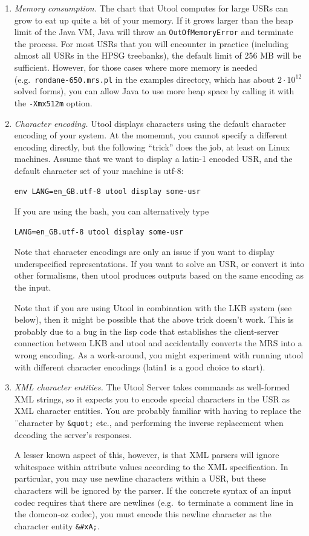 \begin{enumerate}
\item \textit{Memory consumption.} The chart that Utool computes for
large USRs can grow to eat up quite a bit of your memory. If it grows
larger than the heap limit of the Java VM, Java will throw an
\verb?OutOfMemoryError? and terminate the process. For most USRs that
you will encounter in practice (including almost all USRs in the HPSG
treebanks), the default limit of 256 MB will be sufficient. However,
for those cases where more memory is needed (e.g.\
\verb?rondane-650.mrs.pl? in the examples directory, which has about
$2 \cdot 10^{12}$ solved forms), you can allow Java to use more heap
space by calling it with the \verb?-Xmx512m? option.

\item \textit{Character encoding.} Utool displays characters using the default
character encoding of your system. At the momemnt, you cannot specify a different encoding directly, but the following ``trick'' does the job, at least on Linux machines. Assume that we want to display a latin-1 encoded USR, and the default character set of your machine is utf-8:
\begin{verbatim}
env LANG=en_GB.utf-8 utool display some-usr
\end{verbatim}
If you are using the bash, you can alternatively type
\begin{verbatim}
LANG=en_GB.utf-8 utool display some-usr
\end{verbatim}

Note that character encodings are only an issue if you want to display
underspecified representations. If you want to solve an USR, or convert it
into other formalisms, then utool produces outputs based on the same encoding as
the input.

Note that if you are using Utool in combination with the LKB system (see below),
then it might be possible that the above trick doesn't work. This is probably
due to a bug in the lisp code that establishes the client-server connection
between LKB and utool and accidentally converts the MRS into a wrong encoding.
As a work-around, you might experiment with running utool with different
character encodings (latin1 is a good choice to start).

\item \textit{XML character entities.} The Utool Server takes commands
as well-formed XML strings, so it expects you to encode special
characters in the USR as XML character entities. You are probably
familiar with having to replace the \"\ character by \verb?&quot;?
etc., and performing the inverse replacement when decoding the
server's responses.

A lesser known aspect of this, however, is that XML parsers will
ignore whitespace within attribute values according to the XML
specification. In particular, you may use newline characters within a
USR, but these characters will be ignored by the parser. If the
concrete syntax of an input codec requires that there are newlines
(e.g.\ to terminate a comment line in the domcon-oz codec), you must
encode this newline character as the character entity \verb?&#xA;?.
\end{enumerate}




